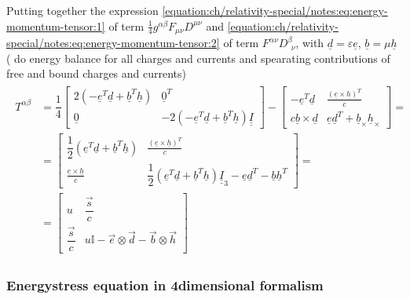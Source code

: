 \documentclass[letterpaper,10pt,english]{jupyterBook}
\begin{document}
\sphinxAtStartPar
Putting together the expression \eqref{equation:ch/relativity-special/notes:eq:energy-momentum-tensor:1} of term \(\frac{1}{4} g^{\alpha \beta} F_{\mu \nu} D^{\mu \nu}\) and \eqref{equation:ch/relativity-special/notes:eq:energy-momentum-tensor:2} of term \(F^{\alpha \nu} D^{\beta}_{\ \ \nu}\), with \(\underline{d} = \varepsilon \underline{e}\), \(\underline{b} = \mu \underline{h}\) ( do energy balance for all charges and currents and spearating contributions of free and bound charges and currents)
\begin{equation*}
\begin{split}\begin{aligned}
 T^{\alpha \beta}
& =
\dfrac{1}{4} \begin{bmatrix} 2(-\underline{e}^T \underline{d} + \underline{b}^T \underline{h}) & \underline{0}^T \\ \underline{0} & - 2(-\underline{e}^T \underline{d} + \underline{b}^T \underline{h}) \underline{\underline{I}} \end{bmatrix}
- 
  \begin{bmatrix}
    - \underline{e}^T \underline{d} & \frac{\left( \underline{e} \times \underline{h} \right)^T}{c} \\
      c \underline{b} \times \underline{d} & \underline{e} \underline{d}^T + \underline{b}_{\times} \underline{h}_{\times}
  \end{bmatrix} = \\
& =
\begin{bmatrix} \dfrac{1}{2}\left(\underline{e}^T \underline{d} + \underline{b}^T \underline{h} \right) & \frac{\left( \underline{e} \times \underline{h} \right)^T}{c} \\ \frac{\underline{e} \times \underline{h}}{c} & \dfrac{1}{2}(\underline{e}^T \underline{d} + \underline{b}^T \underline{h}) \underline{\underline{I}}_3 - \underline{e} \underline{d}^T - \underline{b} \underline{h}^T \end{bmatrix} = \\
& =
\begin{bmatrix} u & \dfrac{\vec{s}}{c} \\ \dfrac{\vec{s}}{c} & u \mathbb{I} - \vec{e} \otimes \vec{d} - \vec{b} \otimes \vec{h} \end{bmatrix}
\end{aligned}\end{split}
\end{equation*}\subsubsection*{Energy\sphinxhyphen{}stress equation in 4\sphinxhyphen{}dimensional formalism}
\end{document}

